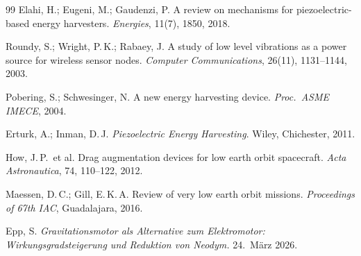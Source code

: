 ﻿\documentclass[12pt, a4paper]{report}
\theoremstyle{definition}
\theoremstyle{remark}
\begin{document}
\begin{thebibliography}{99}
  Elahi, H.; Eugeni, M.; Gaudenzi, P.
  A review on mechanisms for piezoelectric-based energy harvesters.
  \textit{Energies}, 11(7), 1850, 2018.

  Roundy, S.; Wright, P.\,K.; Rabaey, J.
  A study of low level vibrations as a power source for wireless sensor nodes.
  \textit{Computer Communications}, 26(11), 1131--1144, 2003.

  Pobering, S.; Schwesinger, N.
  A new energy harvesting device.
  \textit{Proc.\ ASME IMECE}, 2004.

  Erturk, A.; Inman, D.\,J.
  \textit{Piezoelectric Energy Harvesting}.
  Wiley, Chichester, 2011.

  How, J.\,P.\ et al.
  Drag augmentation devices for low earth orbit spacecraft.
  \textit{Acta Astronautica}, 74, 110--122, 2012.

  Maessen, D.\,C.; Gill, E.\,K.\,A.
  Review of very low earth orbit missions.
  \textit{Proceedings of 67th IAC}, Guadalajara, 2016.

  Epp, S.
  \textit{Gravitationsmotor als Alternative zum Elektromotor:
  Wirkungsgradsteigerung und Reduktion von Neodym.}
  24.~März 2026.

\end{thebibliography}

\end{document}
